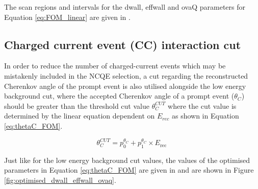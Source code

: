 The scan regions and intervals for the dwall, effwall and ovaQ parameters for Equation \ref{eq:FOM_linear} are given in \cite{Abe_2019}. 

\subsection{Charged current event (CC) interaction cut}

In order to reduce the number of charged-current events which may be mistakenly included in the NCQE selection, a cut regarding the reconstructed Cherenkov angle of the prompt event  is also utilised alongside the low energy background cut, where the accepted Cherenkov angle of a prompt event ($\theta_{C}$) should be greater than the threshold cut value $\theta_{C}^{CUT}$ where the cut value is determined by the linear equation dependent on $E_{rec}$ as shown in Equation \ref{eq:thetaC_FOM}.

\begin{equation}
    \theta_{C}^{C U T}=p_{0}^{\theta_{C}}+p_{1}^{\theta_{C}} \times E_{\text {rec }}
    \label{eq:thetaC_FOM} 
\end{equation}

Just like for the low energy background cut values, the values of the optimised parameters in Equation \ref{eq:thetaC_FOM} are given in \cite{Abe_2019} and are shown in Figure \ref{fig:optimised_dwall_effwall_ovaq}.


